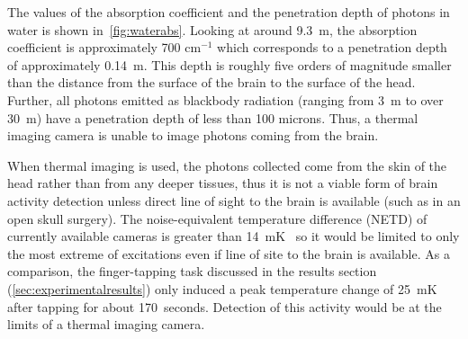 The values of the absorption coefficient and the penetration depth of photons in water is shown in~\cref{fig:waterabs}. Looking at around 9.3~\textmu m, the absorption coefficient is approximately 700 cm$^{-1}$ which corresponds to a penetration depth of approximately 0.14~\textmu m.  This depth is roughly five orders of magnitude smaller than the distance from the surface of the brain to the surface of the head.  Further, all photons emitted as blackbody radiation (ranging from 3~\textmu m to over 30~\textmu m) have a penetration depth of less than 100 microns.  Thus, a thermal imaging camera is unable to image photons coming from the brain.

When thermal imaging is used, the photons collected come from the skin of the head rather than from any deeper tissues, thus it is not a viable form of brain activity detection unless direct line of sight to the brain is available (such as in an open skull surgery).  The noise-equivalent temperature difference (NETD) of currently available cameras is greater than 14~mK~\citep{flir,ici} so it would be limited to only the most extreme of excitations even if line of site to the brain is available.  As a comparison, the finger-tapping task discussed in the results section (\cref{sec:experimentalresults}) only induced a peak temperature change of 25~mK after tapping for about 170~seconds.  Detection of this activity would be at the limits of a thermal imaging camera.

